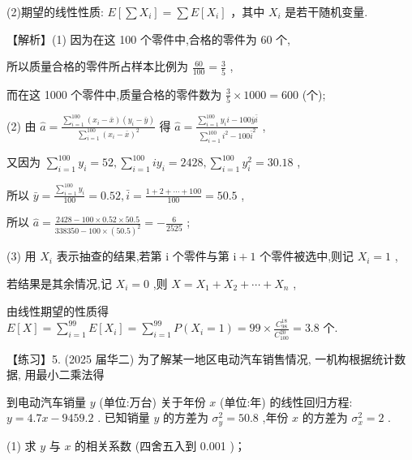 \documentclass[10pt]{article}
\begin{document}
(2)期望的线性性质: \(E\left\lbrack  {\sum {X}_{i}}\right\rbrack   = \sum E\left\lbrack  {X}_{i}\right\rbrack\) ，其中 \({X}_{i}\) 是若干随机变量.

【解析】(1) 因为在这 100 个零件中,合格的零件为 60 个,

所以质量合格的零件所占样本比例为 \(\frac{60}{100} = \frac{3}{5}\) ,

而在这 1000 个零件中,质量合格的零件数为 \(\frac{3}{5} \times  {1000} = {600}\) (个);

(2) 由 \(\widehat{a} = \frac{\mathop{\sum }\limits_{{i = 1}}^{{100}}\left( {{x}_{i} - \bar{x}}\right) \left( {{y}_{i} - \bar{y}}\right) }{\mathop{\sum }\limits_{{i = 1}}^{{100}}{\left( {x}_{i} - \bar{x}\right) }^{2}}\) 得 \(\widehat{a} = \frac{\mathop{\sum }\limits_{{i = 1}}^{{100}}{y}_{i}i - {100}\bar{y}\bar{i}}{\mathop{\sum }\limits_{{i = 1}}^{{100}}{i}^{2} - {100}{\bar{i}}^{2}}\) ,

又因为 \(\mathop{\sum }\limits_{{i = 1}}^{{100}}{y}_{i} = {52},\mathop{\sum }\limits_{{i = 1}}^{{100}}i{y}_{i} = {2428},\mathop{\sum }\limits_{{i = 1}}^{{100}}{y}_{i}^{2} = {30.18}\) ,

所以 \(\bar{y} = \frac{\mathop{\sum }\limits_{{i = 1}}^{{100}}{y}_{i}}{100} = {0.52},\bar{i} = \frac{1 + 2 + \cdots  + {100}}{100} = {50.5}\) ,

所以 \(\widehat{a} = \frac{{2428} - {100} \times  {0.52} \times  {50.5}}{{338350} - {100} \times  {\left( {50.5}\right) }^{2}} =  - \frac{6}{2525}\) ;

(3) 用 \({X}_{i}\) 表示抽查的结果,若第 \(\mathrm{i}\) 个零件与第 \(\mathrm{i} + 1\) 个零件被选中,则记 \({X}_{i} = 1\) ,

若结果是其余情况,记 \({X}_{i} = 0\) ,则 \(X = {X}_{1} + {X}_{2} + \cdots  + {X}_{n}\) ,

由线性期望的性质得 \(E\left\lbrack  X\right\rbrack   = \mathop{\sum }\limits_{{i = 1}}^{{99}}E\left\lbrack  {X}_{i}\right\rbrack   = \mathop{\sum }\limits_{{i = 1}}^{{99}}P\left( {{X}_{i} = 1}\right)  = {99} \times  \frac{{C}_{98}^{18}}{{C}_{100}^{20}} = {3.8}\) 个.

【练习】5. (2025 届华二) 为了解某一地区电动汽车销售情况, 一机构根据统计数据, 用最小二乘法得

到电动汽车销量 \(y\) (单位:万台) 关于年份 \(x\) (单位:年) 的线性回归方程: \(y = {4.7x} - {9459.2}\) . 已知销量 \(y\) 的方差为 \({\sigma }_{y}^{2} = {50.8}\) ,年份 \(x\) 的方差为 \({\sigma }_{x}^{2} = 2\) .

(1) 求 \(y\) 与 \(x\) 的相关系数 (四舍五入到 0.001 )；
\end{document}
